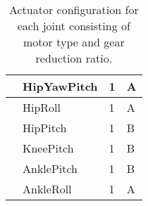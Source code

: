 \begin{table}
\begin{tabulary}{\textwidth}{|l||l|l|l|}
                & HipYawPitch      & 1                    & A               \\	\hline 
                & HipRoll          & 1                    & A               \\	\hline 
                & HipPitch         & 1                    & B               \\	\hline 
                & KneePitch        & 1                    & B               \\	\hline 
                & AnklePitch       & 1                    & B               \\	\hline 
                & AnkleRoll        & 1                    & A               \\	\hline 
\end{tabulary} 
\caption{Actuator configuration for each joint consisting of motor type and gear reduction ratio.}
\label{tab:joint_motor_gear}
\end{table}

